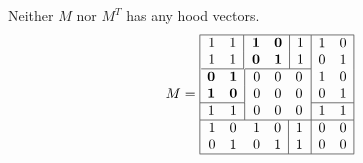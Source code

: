 \begin{example}\label{ex:first monopole}Neither $M$ nor $M^T$ has any hood vectors.
\[ \linespread{1}\selectfont M = 
	\begin{array}{|@{}c@{}c@{}|@{}c@{}|}\hline
		\begin{array}{cc|}
			1	& 1\\
			1	& 1\\\hline
		\end{array}
		&\begin{array}{cc|c}
			\AJbf1	& \AJbf0	& 1\\
			\AJbf0	& \AJbf1	& 1\\\hline
		\end{array}
		&\begin{array}{cc}
			1	& 0\\
			0	& 1
		\end{array}\\
		\begin{array}{cc|}
			\AJbf0	& \AJbf1\\
			\AJbf1	& \AJbf0\\\hline
			1	& 1
		\end{array}
		&\begin{array}{ccc}
			0	& 0	& 0\\
			0	& 0	& 0\\
			0	& 0	& 0
		\end{array}
		&\begin{array}{cc}
			1	& 0\\
			0	& 1\\\hline
			1	& 1
		\end{array}\\\hline
		\begin{array}{cc}
			1	& 0\\
			0	& 1
		\end{array}
		&\begin{array}{cc|c}
			1	& 0	& 1\\
			0	& 1	& 1
		\end{array}
		&\begin{array}{cc}
			0	& 0\\
			0	& 0
		\end{array}\\\hline
	\end{array}
\]
\end{example}
